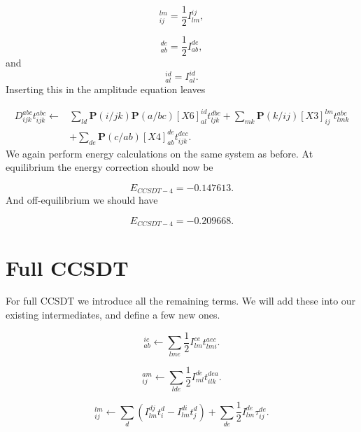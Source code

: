 \begin{equation}
[X3]_{ij}^{lm} = \frac{1}{2} I_{lm}^{ij} ,
\end{equation}

\begin{equation}
[X4]_{ab}^{de} = \frac{1}{2} I_{ab}^{de} ,
\end{equation}
and
\begin{equation}
[X6]_{al}^{id} = I_{al}^{id} .
\end{equation}
Inserting this in the amplitude equation leaves

\begin{align}
D_{ijk}^{abc} t_{ijk}^{abc} \leftarrow &
\sum _{ld}
\textbf{P}(i/jk) \textbf{P}(a/bc) 
[X6]_{al}^{id} t^{dbc}_{ljk}
+
 \sum_{mk}
\textbf{P}(k/ij) [X3]_{ij}^{lm} t_{lmk}^{abc}
\nonumber \\ &
+
\sum_{de}
\textbf{P}(c/ab)[X4]_{ab}^{de}  t^{dec}_{ijk} .
\end{align}
We again perform energy calculations on the same system as before. At equilibrium the energy correction should now be

\begin{equation}
E_{CCSDT-4} = -0.147613 .
\end{equation}
And off-equilibrium we should have

\begin{equation}
E_{CCSDT-4} = -0.209668 .
\end{equation}

\section{Full CCSDT}
For full CCSDT we introduce all the remaining terms. We will add these into our existing intermediates, and define a few new ones.

\begin{equation}
[X1]_{ab}^{ic} \leftarrow 
\sum_{lme}
\frac{1}{2}
I_{lm}^{ce} t_{lmi}^{aec} .
\end{equation}

\begin{equation}
[X2]_{ij}^{am} \leftarrow 
\sum_{lde}
\frac{1}{2}
I_{ml}^{de} t_{ilk}^{dea} .
\end{equation}

\begin{equation}
[X3]_{ij}^{lm} \leftarrow
\sum_d \left( I_{lm}^{dj} t_i^d
- I_{lm}^{di} t_j^d \right)
+ \sum_{de} \frac{1}{2} I_{lm}^{de} \tau_{ij}^{de} .
\end{equation}

